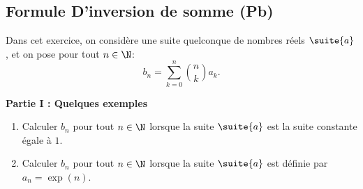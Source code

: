 






\subsection{Formule D'inversion de somme (Pb)}



\begin{exercice}
Dans cet exercice, on considère une suite quelconque de nombres réels $\suite{a}$, et on pose pour tout $n\in \N$:
$$b_n =\sum_{k=0}^n \binom{n}{k} a_k.$$
\begin{center}
\textbf{Partie I : Quelques exemples}
\end{center}
\begin{enumerate}
\item Calculer $b_n$ pour tout $n \in \N$ lorsque la suite $\suite{a}$ est la suite constante égale à $1$.
\item Calculer $b_n$ pour tout $n \in \N$ lorsque la suite $\suite{a}$ est définie par $a_n=\exp(n)$. 


\end{enumerate}
\end{exercice}
